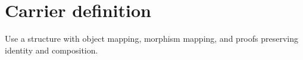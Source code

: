 \section{Carrier definition}

\begin{definition}
\label{def:functor-carrier}
Use a structure with object mapping, morphism mapping, and proofs preserving identity and composition.
\end{definition}
